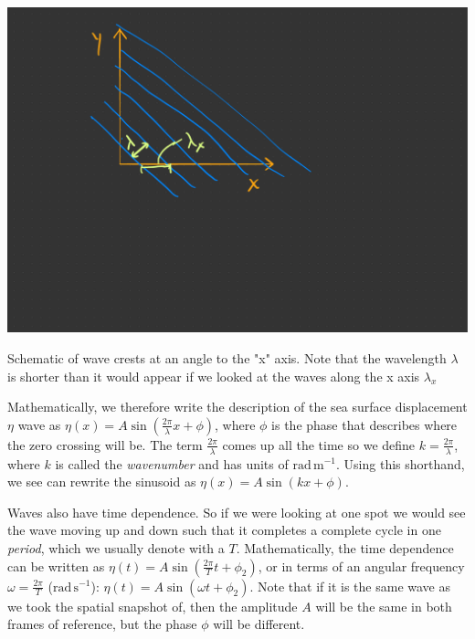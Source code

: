 \begin{marginfigure}
  \includegraphics{figs/Waves/SketchWaveAngle}
    \caption{Schematic of wave crests at an angle to the "x" axis.  Note that the wavelength $\lambda$ is shorter than it would appear if we looked at the waves along the x axis $\lambda_x$}
    \label{fig:SketchWaveAngle}  
\end{marginfigure}

Mathematically, we therefore write the description of the sea surface displacement $\eta$ wave as $\eta(x) = A \sin \left( \frac{ 2\pi}{\lambda}x +\phi\right)$, where $\phi$ is the phase that describes where the zero crossing will be.  The term $\frac{2\pi}{\lambda}$ comes up all the time so we define $k = \frac{2\pi}{\lambda}$, where $k$ is called the \emph{wavenumber} and has units of $\mathrm{rad\,m^{-1}}$.  Using this shorthand, we see can rewrite the sinusoid as $\eta(x) = A \sin \left( kx +\phi\right)$.

Waves also have time dependence.  So if we were looking at one spot we would see the wave moving up and down such that it completes a complete cycle in one \emph{period}, which we usually denote with a $T$.  Mathematically, the time dependence can be written as $\eta(t) = A \sin \left( \frac{ 2\pi}{T}t +\phi_2\right)$, or in terms of an angular frequency $\omega = \frac{2\pi}{T}$ ($\mathrm{rad\,s^{-1}}$):  $\eta(t) = A \sin \left( \omega t +\phi_2 \right)$.  Note that if it is the same wave as we took the spatial snapshot of, then the amplitude $A$ will be the same in both frames of reference, but the phase $\phi$ will be different.  

